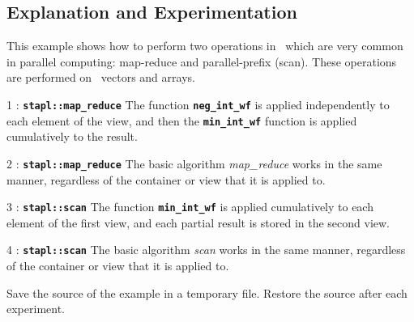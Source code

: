 \documentclass{report}
\begin{document}
\subsection{Explanation and Experimentation}

This example shows how to perform two operations in \stapl\
which are very common in parallel computing:
map-reduce and parallel-prefix (scan).
These operations are performed on \stapl\ vectors and arrays.

\begin{hashitemize}
\item 1 : \texttt{{\bf stapl::map\_reduce}}
\newline
The function
\texttt{{\bf neg\_int\_wf}}
is applied independently to each element of the view, and then the
\texttt{{\bf min\_int\_wf}}
function is applied cumulatively to the result.

\item 2 : \texttt{{\bf stapl::map\_reduce}}
\newline
The basic algorithm \emph{map\_reduce} works in the same manner,
regardless of the container or view that it is applied to.

\item 3 : \texttt{{\bf stapl::scan}}
\newline
The function
\texttt{{\bf min\_int\_wf}}
is applied cumulatively to each element of the first view, and
each partial result is stored in the second view.

\item 4 : \texttt{{\bf stapl::scan}}
\newline
The basic algorithm \emph{scan} works in the same manner,
regardless of the container or view that it is applied to.

\end{hashitemize}

Save the source of the example in a temporary file.
Restore the source after each experiment.
\end{document}
